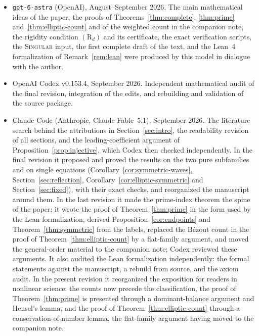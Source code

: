 \documentclass[11pt]{article}
\theoremstyle{definition}
\theoremstyle{remark}
\numberwithin{equation}{section}
\begin{document}
\begin{itemize}
\item \texttt{gpt-6-astra} (OpenAI), August--September 2026. The main
mathematical ideas of the paper, the proofs of
Theorems~\ref{thm:complete}, \ref{thm:prime}
and~\ref{thm:elliptic-count} and of the weighted count in the companion
note, the rigidity condition
\((\mathrm R_d)\) and its certificate, the exact verification scripts,
the \textsc{Singular} input, the first complete draft of the text,
and the Lean~4 formalization of Remark~\ref{rem:lean} were produced by
this model in dialogue with the author.
\item OpenAI Codex v0.153.4, September 2026. Independent mathematical
audit of the final revision, integration of the edits, and rebuilding
and validation of the source package.
\item Claude Code (Anthropic, Claude Fable~5.1), September 2026. The
literature search behind the attributions in Section~\ref{sec:intro},
the readability revision of all sections, and the leading-coefficient
argument of Proposition~\ref{prop:injective}, which Codex then checked
independently. In the final revision it proposed and proved the
results on the two pure subfamilies and on single equations
(Corollary~\ref{cor:symmetric-waves}, Section~\ref{sec:reflection},
Corollary~\ref{cor:elliptic-symmetric} and Section~\ref{sec:fixed}),
with their exact checks, and reorganized the manuscript around them.
In the last revision it made the prime-index theorem the spine of the
paper: it wrote the proof of Theorem~\ref{thm:prime} in the form used
by the Lean formalization, derived
Proposition~\ref{cor:endpoints} and Theorem~\ref{thm:symmetric} from
the labels, replaced the B\'ezout count in the proof of
Theorem~\ref{thm:elliptic-count} by a flat-family argument, and moved
the general-order material to the companion note; Codex reviewed these
arguments. It also audited the Lean formalization independently:
the formal statements against the manuscript, a rebuild from source,
and the axiom audit.
In the present revision it reorganized the exposition for readers in
nonlinear science: the counts now precede the classification, the
proof of Theorem~\ref{thm:prime} is presented through a
dominant-balance argument and Hensel's lemma, and the proof of
Theorem~\ref{thm:elliptic-count} through a conservation-of-number
lemma, the flat-family argument having moved to the companion note.
\end{itemize}

{\footnotesize\raggedright
\setlength{\bibsep}{3pt}


}
\end{document}
